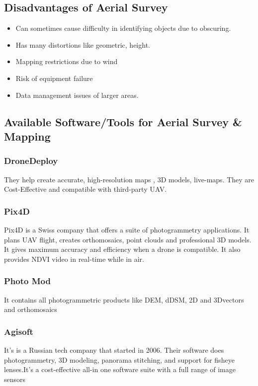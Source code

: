 \documentclass[11pt,twocolumn,letterpaper]{article}
\begin{document}
\subsection{Disadvantages of Aerial Survey}
\begin{itemize}
\item Can sometimes cause difficulty in identifying objects due to obscuring. 
\item Has many distortions like geometric, height.
\item Mapping restrictions due to wind
\item Risk of equipment failure
\item Data management issues of larger areas.

\end{itemize}

\subsection{Available Software/Tools for Aerial Survey & Mapping }
\subsubsection{DroneDeploy}
They help create accurate, high-resolution maps , 3D models, live-maps. They are Cost-Effective and compatible with third-party UAV.


\subsubsection{Pix4D}
Pix4D is a Swiss company that offers a suite of photogrammetry applications. It plans UAV flight, creates
orthomosaics, point clouds and professional 3D models. It gives maximum accuracy and efficiency when a drone is compatible. It also provides NDVI video in real-time while in air.

\subsubsection{Photo Mod}
It contains all photogrammetric products like DEM, dDSM, 2D and 3Dvectors and orthomosaics

\subsubsection{Agisoft}
It's is a Russian tech company that started in 2006. Their software does photogrammetry, 3D modeling, panorama stitching, and support for fisheye lenses.It's a cost-effective all-in one software suite
with a full range of image sensors
\end{document}
